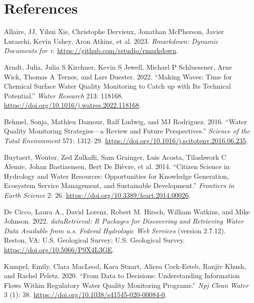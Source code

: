\hypertarget{references}{%
\section*{References}\label{references}}

\hypertarget{refs}{}
\begin{CSLReferences}{1}{0}
\leavevmode{}%
Allaire, JJ, Yihui Xie, Christophe Dervieux, Jonathan McPherson, Javier Luraschi, Kevin Ushey, Aron Atkins, et al. 2023. \emph{Rmarkdown: Dynamic Documents for r}. \url{https://github.com/rstudio/rmarkdown}.

\leavevmode{}%
Arndt, Julia, Julia S Kirchner, Kevin S Jewell, Michael P Schluesener, Arne Wick, Thomas A Ternes, and Lars Duester. 2022. {``Making Waves: Time for Chemical Surface Water Quality Monitoring to Catch up with Its Technical Potential.''} \emph{Water Research} 213: 118168. \url{https://doi.org/10.1016/j.watres.2022.118168}.

\leavevmode{}%
Behmel, Sonja, Mathieu Damour, Ralf Ludwig, and MJ Rodriguez. 2016. {``Water Quality Monitoring Strategies---a Review and Future Perspectives.''} \emph{Science of the Total Environment} 571: 1312--29. \url{https://doi.org/10.1016/j.scitotenv.2016.06.235}.

\leavevmode{}%
Buytaert, Wouter, Zed Zulkafli, Sam Grainger, Luis Acosta, Tilashwork C Alemie, Johan Bastiaensen, Bert De Bièvre, et al. 2014. {``Citizen Science in Hydrology and Water Resources: Opportunities for Knowledge Generation, Ecosystem Service Management, and Sustainable Development.''} \emph{Frontiers in Earth Science} 2: 26. \url{https://doi.org/10.3389/feart.2014.00026}.

\leavevmode{}%
De Cicco, Laura A., David Lorenz, Robert M. Hirsch, William Watkins, and Mike Johnson. 2022. \emph{dataRetrieval: R Packages for Discovering and Retrieving Water Data Available from u.s. Federal Hydrologic Web Services} (version 2.7.12). Reston, VA: U.S. Geological Survey; U.S. Geological Survey. \url{https://doi.org/10.5066/P9X4L3GE}.

\leavevmode{}%
Kumpel, Emily, Clara MacLeod, Kara Stuart, Alicea Cock-Esteb, Ranjiv Khush, and Rachel Peletz. 2020. {``From Data to Decisions: Understanding Information Flows Within Regulatory Water Quality Monitoring Programs.''} \emph{Npj Clean Water} 3 (1): 38. \url{https://doi.org/10.1038/s41545-020-00084-0}.


\end{CSLReferences}
